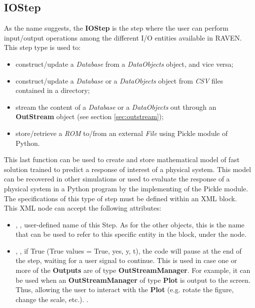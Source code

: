 \subsection{IOStep}
\label{subsec:stepIOStep}
As the name suggests, the \textbf{IOStep} is the step where the user can perform
input/output operations among the different I/O entities available in RAVEN.
%
This step type is used to: 
\begin{itemize}
 \item construct/update a \textit{Database} from a \textit{DataObjects} object, and
   vice versa;
 \item construct/update a \textit{Database} or a \textit{DataObjects} object from
   \textit{CSV} files contained in a directory;
 \item stream the content of a \textit{Database} or a \textit{DataObjects} out through
   an \textbf{OutStream} object (see section \ref{sec:outstream});
\item store/retrieve a \textit{ROM} to/from an external \textit{File} using Pickle module
 of Python.
\end{itemize}
This last function can be used to create and store mathematical model of fast solution
 trained to predict a response of interest of a physical system. This model can be 
recovered in other simulations or used to evaluate the response of a physical system
 in a Python program by the implementing of the Pickle module. 
%
The specifications of this type of step must be defined within an
 XML block.
%
This XML node can accept the following attributes:
\vspace{-5mm}
\begin{itemize}
\itemsep0em
\item {}, , user-defined name of
  this Step.
  \nb As for the other objects, this is the name that can be used to refer to
    this specific entity in the  block, under the 
     node.
\item {}, , if True
  (True values = True, yes, y, t), the code will pause at the end of
  the step, waiting for a user signal to continue. This is used in case one or
  more of the \textbf{Outputs} are of type \textbf{OutStreamManager}.
  For example, it can be used when an \textbf{OutStreamManager} of type
  \textbf{Plot} is output to the screen. Thus, allowing the user to interact
  with the \textbf{Plot} (e.g. rotate the figure, change the scale, etc.).
.
\end{itemize}
